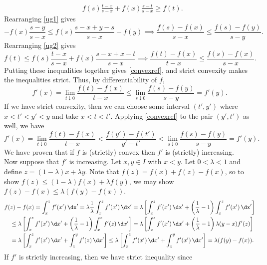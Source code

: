 \documentclass[../borwein-lewis_notes.tex]{subfiles}
\begin{document}
\begin{enumerate}[(a)]
{\begin{align}
\label{ug2}
&f(s)\frac{t-x}{s-x} + f(x)\frac{s-t}{s-x} \geq f(t).
\end{align}
Rearranging \eqref{ug1} gives 
\begin{equation*}
-f(x)\frac{s-y}{s-x} \leq f(s)\frac{s-x + y-s}{s-x} - f(y) 
\implies \frac{f(s)-f(x)}{s-x} \leq \frac{f(s)-f(y)}{s-y}.
\end{equation*}
Rearranging \eqref{ug2} gives 
\begin{equation*}
f(t) \leq f(s)\frac{t-x}{s-x} + f(x)\frac{s-x+x-t}{s-x}
\implies \frac{f(t)-f(x)}{t-x} \leq \frac{f(s)-f(x)}{s-x}.
\end{equation*}
Putting these inequalities together gives \eqref{convexref}, and 
strict convexity makes the inequalities strict. Thus, by differentiability
of $f$, 
\begin{equation*}
f'(x) = \lim_{t\downarrow 0}\frac{f(t)-f(x)}{t-x} \leq 
\lim_{s\downarrow 0}\frac{f(s)-f(y)}{s-y} = f'(y).
\end{equation*}
If we have strict convexity, then we can choose some interval 
$(t',y')$ where $x<t'<y'<y$ and take $x<t<t'$. Applying \eqref{convexref}
to the pair $(y',t')$ as well, we have 
\begin{equation*}
f'(x) = \lim_{t\downarrow 0}\frac{f(t)-f(x)}{t-x}
< \frac{f(y') - f(t')}{y'-t'} < \lim_{s\downarrow0}\frac{f(s)-f(y)}{s-y}
= f'(y).
\end{equation*}
We have proven that if $f$ is (strictly) convex then $f'$ is 
(strictly) increasing. \\
Now suppose that $f'$ is increasing. Let $x,y\in I$ with $x<y$.
Let $0<\lambda < 1$ and define $z=(1-\lambda)x + \lambda y$. Note that 
$f(z) = f(x) + f(z)-f(x)$, so to show $f(z)\leq (1-\lambda)f(x) + 
\lambda f(y)$, we may show $f(z)-f(x) \leq \lambda (f(y)-f(x))$.
\begin{align*}
&f(z)-f(x) = \int_x^z f'(x')\,\dx'  = \lambda\frac{1}{\lambda}\int_x^z
f'(x')\,\dx' = \lambda\left[\int_x^z f'(x')\,\dx'+\left(\frac{1}{\lambda}
-1\right)\int_x^z f'(x')\,\dx'
\right] \\
&\quad
\leq \lambda\left[\int_x^z f'(x')\,\d x'+\left(\frac{1}{\lambda}-1\right)
\int_x^z f'(z)\,\d x'\right] = \lambda\left[\int_x^z f'(x')\,\d x'
+ \left(\frac{1}{\lambda}-1\right)\lambda(y-x) f'(z)\right]\\
&\quad = \lambda\left[\int_x^z f'(x')\,\d x'
+ \int_z^y f'(z)\,\d x'\right] \leq \lambda\left[\int_x^z f'(x')\,\d x'
+ \int_z^y f'(x')\,\d x'\right] = \lambda(f(y)-f(x)).
\end{align*}
If $f'$ is strictly increasing, then we have strict inequality since 
}
\end{enumerate}
\end{document}
